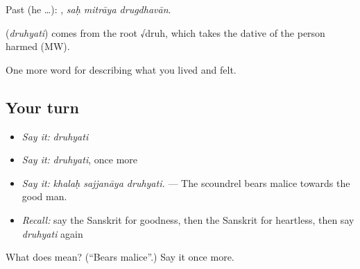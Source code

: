 Past (he …):   , \emph{saḥ mitrāya drugdhavān}.

\begin{cousinweb}
\textbf{} (\emph{druhyati}) comes from the root √druh, which takes the dative of the person harmed (MW).
\end{cousinweb}

\begin{grammarlens}[title={What you've built}]
One more word for describing what you lived and felt.
\end{grammarlens}

\subsection*{Your turn}
\begin{itemize}
\raggedright
  \item \emph{Say it:} \emph{druhyati}
  \item \emph{Say it:} \emph{druhyati}, once more
  \item \emph{Say it:} \emph{khalaḥ sajjanāya druhyati.} — The scoundrel bears malice towards the good man.
  \item \emph{Recall:} say the Sanskrit for goodness, then the Sanskrit for heartless, then say \emph{druhyati} again
\end{itemize}

\begin{tcolorbox}[breakable,colback=teal!4,colframe=teal!35!black,title={Before you move on}]
What does  mean? (\textquotedblleft{}Bears malice\textquotedblright{}.) Say it once more.
\end{tcolorbox}

